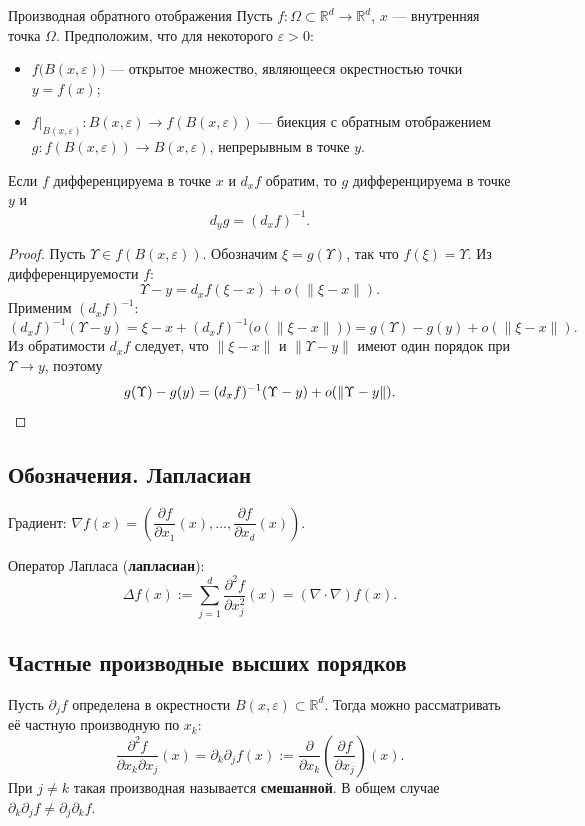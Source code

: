 \begin{Theorem}{Производная обратного отображения}{}
	Пусть $f\colon\Omega\subset\mathbb{R}^d\to\mathbb{R}^d$, $x$ --- внутренняя точка $\Omega$.
	Предположим, что для некоторого $\varepsilon>0$:
	\begin{itemize}
		\item $f\bigl(B(x,\varepsilon)\bigr)$ --- открытое множество, являющееся окрестностью
		точки $y=f(x)$;
		\item $f|_{B(x,\varepsilon)}\colon B(x,\varepsilon)\to f(B(x,\varepsilon))$ --- биекция
		с обратным отображением $g\colon f(B(x,\varepsilon))\to B(x,\varepsilon)$,
		непрерывным в точке $y$.
	\end{itemize}
	Если $f$ дифференцируема в точке $x$ и $d_xf$ обратим, то $g$ дифференцируема
	в точке $y$ и
	\[
	d_yg = (d_xf)^{-1}.
	\]
\end{Theorem}

\begin{proof}
	Пусть $\Upsilon\in f(B(x,\varepsilon))$. Обозначим $\xi=g(\Upsilon)$, так что $f(\xi)=\Upsilon$.
	Из дифференцируемости $f$:
	\[
	\Upsilon - y = d_xf(\xi-x)+o(\|\xi-x\|).
	\]
	Применим $(d_xf)^{-1}$:
	\[
	(d_xf)^{-1}(\Upsilon-y) = \xi-x + (d_xf)^{-1}\bigl(o(\|\xi-x\|)\bigr)
	= g(\Upsilon)-g(y)+o(\|\xi-x\|).
	\]
	Из обратимости $d_xf$ следует, что $\|\xi-x\|$ и $\|\Upsilon-y\|$ имеют один порядок
	при $\Upsilon\to y$, поэтому
	\[
	g(\Upsilon)-g(y) = (d_xf)^{-1}(\Upsilon-y)+o(\|\Upsilon-y\|). \qedhere
	\]
\end{proof}

\subsection{Обозначения. Лапласиан}

Градиент: $\nabla f(x) = \left(\dfrac{\partial f}{\partial x_1}(x),\dots,
\dfrac{\partial f}{\partial x_d}(x)\right)$.

Оператор Лапласа (\textbf{лапласиан}):
\[
\Delta f(x) := \sum_{j=1}^{d}\frac{\partial^2 f}{\partial x_j^2}(x)
= (\nabla\cdot\nabla)f(x).
\]

\subsection{Частные производные высших порядков}

Пусть $\partial_j f$ определена в окрестности $B(x,\varepsilon)\subset\mathbb{R}^d$.
Тогда можно рассматривать её частную производную по $x_k$:
\[
\frac{\partial^2 f}{\partial x_k\partial x_j}(x)
=\partial_k\partial_j f(x)
:=\frac{\partial}{\partial x_k}\!\left(\frac{\partial f}{\partial x_j}\right)(x).
\]
При $j\ne k$ такая производная называется \textbf{смешанной}. В общем случае
$\partial_k\partial_j f \ne \partial_j\partial_k f$.

